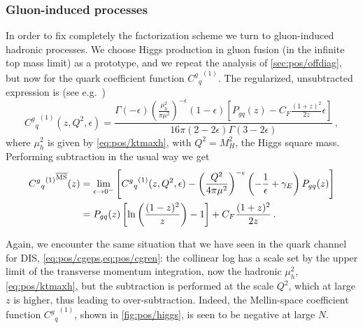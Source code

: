 \subsubsection{Gluon-induced processes}
\label{sec:pos/higgs}
In order to fix completely the factorization scheme we turn to
gluon-induced hadronic processes. We choose Higgs production in gluon
fusion (in the infinite top mass limit) as a prototype, and we repeat the  analysis of
\cref{sec:pos/offdiag}, but now for the quark coefficient function
${{{C^g}_q}^{(1)}}$. The regularized, unsubtracted expression is (see
e.g.~\cite{Maltoni:2018dar}) 
\begin{equation}\label{eq:pos/cgqeps}
{C^g{}_q}^{(1)}(z,Q^2,\epsilon) =
  \frac{ \Gamma(-\epsilon)
  \left(\frac{\mu_h^2}{\pi\mu^2}\right)^{-\epsilon} (1-\epsilon) \left[P_{gq}(z) - C_F \frac{(1+z)^2}{2z} \epsilon \right]}{16\pi (2 - 2\epsilon) \Gamma (3 - 2 \epsilon)}\,,
\end{equation}
where $\mu_h^2$ is given by \cref{eq:pos/ktmaxh}, with $Q^2=M_H^2$,
the Higgs square mass.
Performing  \msbar{} subtraction in the usual way we get
\begin{align}\label{eq:pos/cgqren}
{  {C^g{}_q}^{(1)}}^{{\overline{\textrm{MS}}}}(z) &= \lim_{\epsilon\to
  0^-}\left[{{C^{g}}_q}^{(1)}(z,Q^2,\epsilon) - \left(\frac{Q^2}{4\pi
      \mu^2}\right)^{-\epsilon} \left(-\frac 1
    {\epsilon}+\gamma_E\right) P_{gq}(z)\right]\\
&= P_{gq}(z)\left[\ln\left(\frac{(1-z)^2}{z}\right) - 1 \right]  + C_F \frac{(1+z)^2}{2z} 
 \,.\label{eq:pos/cgqnlo}
\end{align}

Again, we encounter the same situation that we have seen in the quark
channel for DIS, \cref{eq:pos/cgeps,eq:pos/cgren}: the collinear
log has a scale set by the upper limit of the transverse momentum
integration, now the hadronic $\mu_h^2$, \cref{eq:pos/ktmaxh}, but the
\msbar{} subtraction is performed at the scale $Q^2$, which at large $z$
is higher, thus leading to over-subtraction. Indeed, the Mellin-space
\msbar{} coefficient function  ${{{C^g}_q}^{(1)}}$, shown in
\cref{fig:pos/higgs}, is seen to be negative at large $N$.


